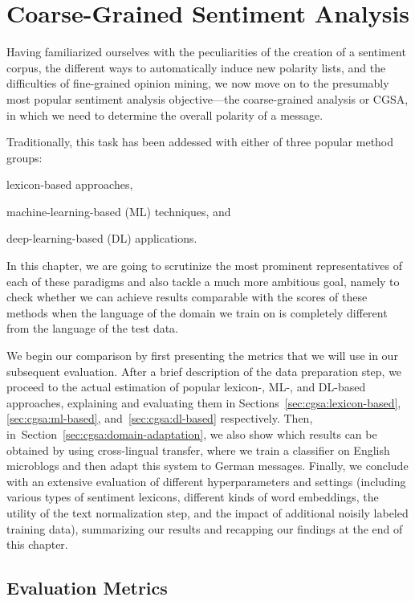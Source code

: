 \chapter{Coarse-Grained Sentiment Analysis}\label{sec:snt:cgsa}

Having familiarized ourselves with the peculiarities of the creation
of a sentiment corpus, the different ways to automatically induce new
polarity lists, and the difficulties of fine-grained opinion mining,
we now move on to the presumably most popular sentiment analysis
objective---the coarse-grained analysis or CGSA, in which we need to
determine the overall polarity of a message.

Traditionally, this task has been addessed with either of three
popular method groups:
\begin{inparaenum}[(i)]
  \item lexicon-based approaches,
  \item machine-learning-based (ML) techniques, and
  \item deep-learning-based (DL) applications.
\end{inparaenum}
In this chapter, we are going to scrutinize the most prominent
representatives of each of these paradigms and also tackle a much more
ambitious goal, namely to check whether we can achieve results
comparable with the scores of these methods when the language of the
domain we train on is completely different from the language of the
test data.

We begin our comparison by first presenting the metrics that we will
use in our subsequent evaluation.  After a brief description of the
data preparation step, we proceed to the actual estimation of popular
lexicon-, ML-, and DL-based approaches, explaining and evaluating them
in Sections~\ref{sec:cgsa:lexicon-based}, \ref{sec:cgsa:ml-based},
and~\ref{sec:cgsa:dl-based} respectively.  Then,
in~Section~\ref{sec:cgsa:domain-adaptation}, we also show which
results can be obtained by using cross-lingual transfer, where we
train a classifier on English microblogs and then adapt this system to
German messages.  Finally, we conclude with an extensive evaluation of
different hyperparameters and settings (including various types of
sentiment lexicons, different kinds of word embeddings, the utility of
the text normalization step, and the impact of additional noisily
labeled training data), summarizing our results and recapping our
findings at the end of this chapter.

\section{Evaluation Metrics}\label{sec:cgsa:eval-metrics}

